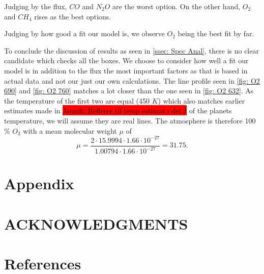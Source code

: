 \documentclass[reprint,english,notitlepage]{revtex4-2}
\begin{document}
Judging by the flux, $ CO $ and $ N_2O  $ are the worst option. On the other hand, $ O_2 $ and $ CH_4 $ rises as the best options. 

Judging by how good a fit our model is, we observe $ O_2 $ being the best fit by far. 

To conclude the discussion of results as seen in \ref{ssec: Spec Anal}, there is no clear candidate which checks all the boxes. We choose to consider how well a fit our model is in addition to the flux the most important factors as that is based in actual data and not our just our own calculations. The line profile seen in \ref{fig: O2 690} and \ref{fig: O2 760} matches a lot closer than the one seen in \ref{fig: O2 632}. As the temperature of the first two are equal (450 $ K $) which also matches earlier estimates made in \colorbox{red}{Jannik: Refferer til temp estimat i del 3} of the planets temperature, we will assume they are real lines. The atmosphere is therefore 100 \% $ O_2 $ with a mean molecular weight $ μ $ of 
\[
μ =   \frac{2 ⋅ 15.9994 ⋅  1.66 ⋅ 10^{-27}}{1.00794 ⋅ 1.66  ⋅  10^{-27}} = 31.75.
\]



\section{Appendix} \label{sec: appendix}

\section*{ACKNOWLEDGMENTS}   

\section*{References} \label{sec: references}
\end{document}
